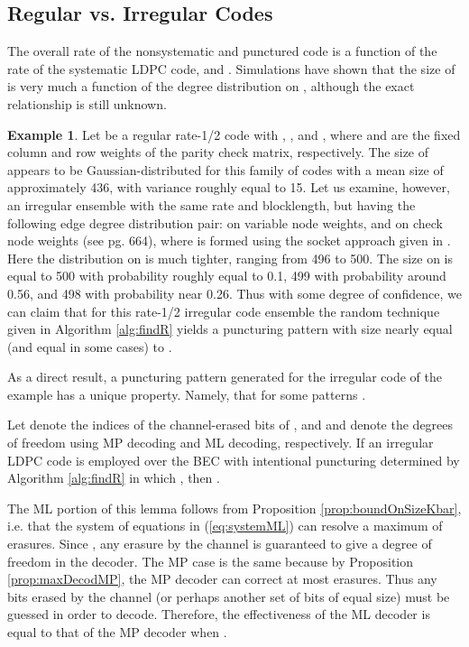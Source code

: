 \documentclass[10pt,twocolumn,twoside]{IEEEtran} \newlength{\pic}
\theoremstyle{definition}
\newtheorem{example}{Example}
\theoremstyle{remark}
\theoremstyle{plain}
\begin{document}
\subsection{Regular vs. Irregular Codes}\label{subsec:regVsIrreg}

The overall rate  of the nonsystematic and punctured code is a function of the rate of the systematic LDPC code, and . Simulations have shown that the size of  is very much a function of the degree distribution on , although the exact relationship is still unknown.
\begin{example}\label{ex:punct}
Let  be a regular rate-1/2 code with , , and , where  and  are the fixed column and row weights of the parity check matrix, respectively. The size of  appears to be Gaussian-distributed for this family of codes with a mean size of approximately 436, with variance roughly equal to 15. Let us examine, however, an irregular ensemble with the same rate and blocklength, but having the following edge degree distribution pair:  on variable node weights, and  on check node weights (see \cite{MoonArches} pg. 664), where  is formed using the socket approach given in \cite{Burshtein04}. Here the distribution on  is much tighter, ranging from 496 to 500. The size on  is equal to 500 with probability roughly equal to 0.1, 499 with probability around 0.56, and 498 with probability near 0.26. Thus with some degree of confidence, we can claim that for this rate-1/2 irregular code ensemble the random technique given in Algorithm \ref{alg:findR} yields a puncturing pattern with size nearly equal (and equal in some cases) to .
\end{example}

As a direct result, a puncturing pattern generated for the irregular code of the example has a unique property. Namely, that for some patterns .
\begin{lemma}\label{lem:degsFree}
Let  denote the indices of the channel-erased bits of , and  and  denote the degrees of freedom using MP decoding and ML decoding, respectively. If an irregular LDPC code is employed over the BEC with intentional puncturing determined by Algorithm \ref{alg:findR} in which , then .
\end{lemma}
\begin{IEEEproof} The ML portion of this lemma follows from Proposition \ref{prop:boundOnSizeKbar}, i.e. that the system of equations in (\ref{eq:systemML}) can resolve a maximum of  erasures. Since , any erasure by the channel is guaranteed to give a degree of freedom in the decoder. The MP case is the same because by Proposition \ref{prop:maxDecodMP}, the MP decoder can correct at most  erasures. Thus any bits erased by the channel (or perhaps another set of bits of equal size) must be guessed in order to decode. Therefore, the effectiveness of the ML decoder is equal to that of the MP decoder when .
\end{IEEEproof}
\end{document}
